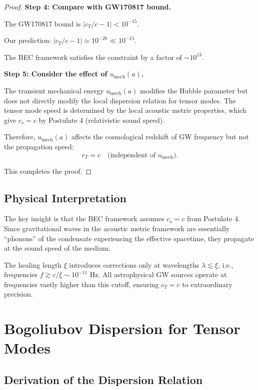 \documentclass[11pt,a4paper]{article}
\newcommand{\cs}{\ensuremath{c_s}}
\newcommand{\cT}{\ensuremath{c_T}}
\newcommand{\umech}{\ensuremath{u_{\mathrm{mech}}}}
\theoremstyle{definition}
\theoremstyle{remark}
\begin{document}
\begin{proof}
\textbf{Step 4: Compare with GW170817 bound.}

The GW170817 bound is $|\cT/c - 1| < 10^{-15}$.

Our prediction: $|\cT/c - 1| \approx 10^{-28} \ll 10^{-15}$.

The BEC framework satisfies the constraint by a factor of $\sim 10^{13}$.

\textbf{Step 5: Consider the effect of $\umech(a)$.}

The transient mechanical energy $\umech(a)$ modifies the Hubble parameter but does not directly modify the local dispersion relation for tensor modes. The tensor mode speed is determined by the local acoustic metric properties, which give $\cs = c$ by Postulate 4 (relativistic sound speed).

Therefore, $\umech(a)$ affects the cosmological redshift of GW frequency but not the propagation speed:
\begin{equation}
\cT = c \quad \text{(independent of } \umech).
\end{equation}

This completes the proof. \qedhere
\end{proof}

\subsection{Physical Interpretation}
\label{sec:speed_interpretation}

The key insight is that the BEC framework assumes $\cs = c$ from Postulate 4. Since gravitational waves in the acoustic metric framework are essentially ``phonons'' of the condensate experiencing the effective spacetime, they propagate at the sound speed of the medium.

The healing length $\xi$ introduces corrections only at wavelengths $\lambda \lesssim \xi$, i.e., frequencies $f \gtrsim c/\xi \sim 10^{-11}$ Hz. All astrophysical GW sources operate at frequencies vastly higher than this cutoff, ensuring $\cT = c$ to extraordinary precision.

\section{Bogoliubov Dispersion for Tensor Modes}
\label{sec:bogoliubov}

\subsection{Derivation of the Dispersion Relation}
\label{sec:dispersion_derivation}
\end{document}
